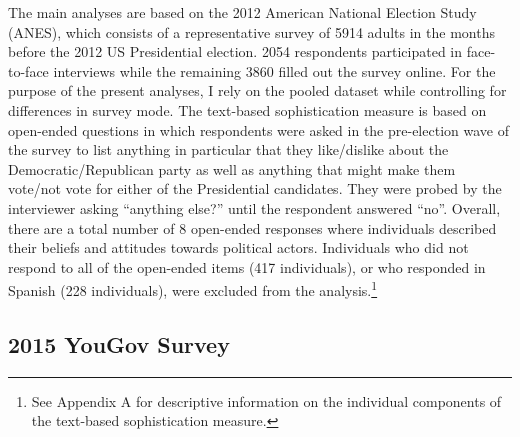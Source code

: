 \documentclass[12pt]{article}
\begin{document}
The main analyses are based on the 2012 American National Election Study (ANES), which consists of a representative survey of 5914 adults in the months before the 2012 US Presidential election. 2054 respondents participated in face-to-face interviews while the remaining 3860 filled out the survey online. For the purpose of the present analyses, I rely on the pooled dataset while controlling for differences in survey mode. The text-based sophistication measure is based on open-ended questions in which respondents were asked in the pre-election wave of the survey to list anything in particular that they like/dislike about the Democratic/Republican party as well as anything that might make them vote/not vote for either of the Presidential candidates. They were probed by the interviewer asking ``anything else?'' until the respondent answered ``no''. Overall, there are a total number of 8 open-ended responses where individuals described their beliefs and attitudes towards political actors. Individuals who did not respond to all of the open-ended items (417 individuals), or who responded in Spanish (228 individuals), were excluded from the analysis.\footnote{See Appendix A for descriptive information on the individual components of the text-based sophistication measure.}

\subsection*{2015 YouGov Survey}
\end{document}
